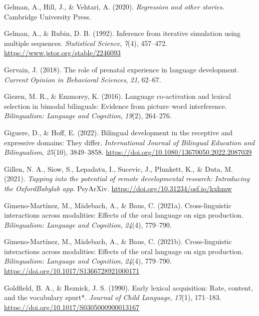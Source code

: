 \documentclass[
  12pt,
  b5paperpaper,
  twoside]{scrreprt}
\newlength{\cslhangindent}
\newlength{\cslentryspacingunit} %
\newenvironment{CSLReferences}[2] %
 {%
  \setlength{\parindent}{0pt}
  \ifodd #1
  \let\oldpar\par
  \def\par{\hangindent=\cslhangindent\oldpar}
  \fi
  \setlength{\parskip}{#2\cslentryspacingunit}
 }%
 {}
\begin{document}
\begin{CSLReferences}{1}{0}
\leavevmode{}%
Gelman, A., Hill, J., \& Vehtari, A. (2020). \emph{Regression and other
stories}. Cambridge University Press.

\leavevmode{}%
Gelman, A., \& Rubin, D. B. (1992). Inference from iterative simulation
using multiple sequences. \emph{Statistical Science}, \emph{7}(4),
457--472. \url{https://www.jstor.org/stable/2246093}

\leavevmode{}%
Gervain, J. (2018). The role of prenatal experience in language
development. \emph{Current Opinion in Behavioral Sciences}, \emph{21},
62--67.

\leavevmode{}%
Giezen, M. R., \& Emmorey, K. (2016). Language co-activation and lexical
selection in bimodal bilinguals: Evidence from picture--word
interference. \emph{Bilingualism: Language and Cognition}, \emph{19}(2),
264--276.

\leavevmode{}%
Giguere, D., \& Hoff, E. (2022). Bilingual development in the receptive
and expressive domains: They differ. \emph{International Journal of
Bilingual Education and Bilingualism}, \emph{25}(10), 3849--3858.
\url{https://doi.org/10.1080/13670050.2022.2087039}

\leavevmode{}%
Gillen, N. A., Siow, S., Lepadatu, I., Sucevic, J., Plunkett, K., \&
Duta, M. (2021). \emph{Tapping into the potential of remote
developmental research: Introducing the {OxfordBabylab} app}.
{PsyArXiv}. \url{https://doi.org/10.31234/osf.io/kxhmw}

\leavevmode{}%
Gimeno-Martínez, M., Mädebach, A., \& Baus, C. (2021a). Cross-linguistic
interactions across modalities: Effects of the oral language on sign
production. \emph{Bilingualism: Language and Cognition}, \emph{24}(4),
779--790.

\leavevmode{}%
Gimeno-Martínez, M., Mädebach, A., \& Baus, C. (2021b). Cross-linguistic
interactions across modalities: Effects of the oral language on sign
production. \emph{Bilingualism: Language and Cognition}, \emph{24}(4),
779--790. \url{https://doi.org/10.1017/S1366728921000171}

\leavevmode{}%
Goldfield, B. A., \& Reznick, J. S. (1990). Early lexical acquisition:
Rate, content, and the vocabulary spurt*. \emph{Journal of Child
Language}, \emph{17}(1), 171--183.
\url{https://doi.org/10.1017/S0305000900013167}


\end{CSLReferences}
\end{document}
